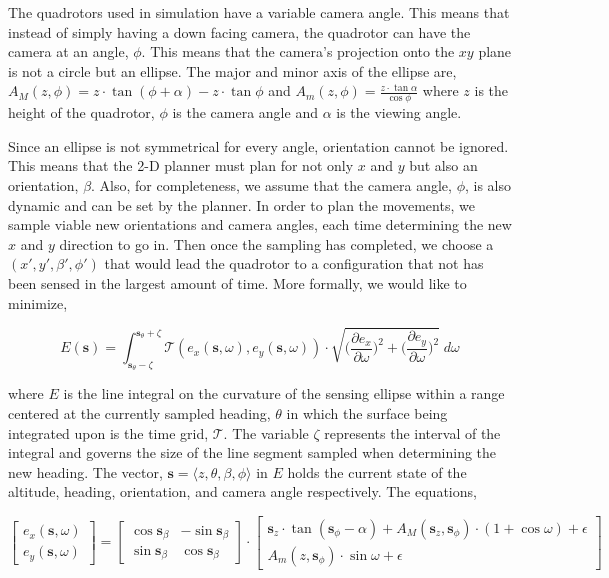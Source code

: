 \documentclass[12pt]{article}
\newcommand{\s}{\textbf{s}}
\begin{document}
The quadrotors used in simulation have a variable camera angle. This means that
instead of simply having a down facing camera, the quadrotor can have the
camera at an angle, $\phi$. This means that the camera's projection onto the
$xy$ plane is not a circle but an ellipse. The major and minor axis of the
ellipse are, $ A_M(z, \phi) = z \cdot \tan{(\phi + \alpha)} - z \cdot
\tan{\phi} $ and $ A_m(z, \phi) = \frac{z \cdot \tan{\alpha}}{\cos{\phi}} $
where $z$ is the height of the quadrotor, $\phi$ is the camera angle and
$\alpha$ is the viewing angle.

Since an ellipse is not symmetrical for every angle, orientation cannot be
ignored.  This means that the 2-D planner must plan for not only $x$ and $y$
but also an orientation, $\beta$. Also, for completeness, we assume that the
camera angle, $\phi$, is also dynamic and can be set by the planner. In order
to plan the movements, we sample viable new orientations and camera angles,
each time determining the new $x$ and $y$ direction to go in.  Then once the
sampling has completed, we choose a $(x', y',
\beta', \phi')$ that would lead the quadrotor to a configuration that not has
been sensed in the largest amount of time. More formally, we would like to
minimize,

$$ E(\s) = \int_{\s_{\theta} - \zeta}^{\s_{\theta} + \zeta}
\mathcal{T}(e_x(\s, \omega), e_y(\s, \omega)) \cdot \sqrt{
    \Big(\frac{\partial e_x}{\partial \omega}\Big) ^ 2 +
\Big(\frac{\partial e_y}{\partial \omega}\Big) ^ 2} \;d\omega $$

where $E$ is the line integral on the curvature of the sensing ellipse within a
range centered at the currently sampled heading, $\theta$ in which the surface
being integrated upon is the time grid, $\mathcal{T}$. The variable $\zeta$
represents the interval of the integral and governs the size of the line
segment sampled when determining the new heading. The vector, $\s =
\langle z, \theta, \beta, \phi \rangle$ in $E$ holds the current state
of the altitude, heading, orientation, and camera angle respectively. The
equations,

$$
\begin{bmatrix}
    e_x(\s, \omega) \\[0.2em] e_y(\s, \omega)
\end{bmatrix} = \begin{bmatrix} \cos{\s_{\beta}} & -\sin{\s_{\beta}} \\[0.2em]
    \sin{\s_{\beta}}
& \cos{\s_{\beta}} \end{bmatrix}\cdot \begin{bmatrix} \s_z \cdot 
    \tan(\s_{\phi} - \alpha) +
    A_M(\s_z, \s_{\phi}) \cdot (1 + \cos{\omega}) + \epsilon \\[0.2em]
    A_m(z, \s_{\phi}) \cdot
\sin{\omega} + \epsilon \end{bmatrix} $$
\end{document}
